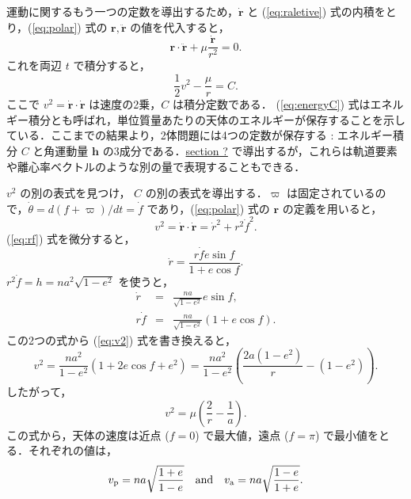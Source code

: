 \documentclass[11pt,a4paper,oneside,onecolumn]{jarticle}
\begin{document}
運動に関するもう一つの定数を導出するため，$\dot{{\bm r}}$ と (\ref{eq:raletive}) 式の内積をとり，(\ref{eq:polar}) 式の ${\bm r}, \ddot{{\bm r}}$ の値を代入すると，
\begin{equation}
{\bm r} \cdot \ddot{{\bm r}} + \mu \frac{\dot{{\bm r}}}{r^2} = 0.
\end{equation}
これを両辺 $t$ で積分すると，
\begin{equation}
\frac{1}{2} v^2 - \frac{\mu}{r} = C. \label{eq:energyC}
\end{equation}
ここで $v^2 = \dot{{\bm r}} \cdot \dot{{\bm r}}$ は速度の2乗，$C$ は積分定数である．
(\ref{eq:energyC}) 式はエネルギー積分とも呼ばれ，単位質量あたりの天体のエネルギーが保存することを示している．ここまでの結果より，2体問題には4つの定数が保存する : エネルギー積分 $C$ と角運動量 ${\bm h}$ の3成分である．\underline{section ?} で導出するが，これらは軌道要素や離心率ベクトルのような別の量で表現することもできる．

$v^2$ の別の表式を見つけ， $C$ の別の表式を導出する．$\varpi$ は固定されているので，$\dot{\theta} = d (f + \varpi) / dt = \dot{f}$ であり，(\ref{eq:polar}) 式の ${\bm r}$ の定義を用いると，
\begin{equation}
v^2 = \dot{{\bm r}} \cdot \dot{{\bm r}} = \dot{r}^2 + r^2 \dot{f}^2. \label{eq:v2}
\end{equation}
(\ref{eq:rf}) 式を微分すると，
\begin{equation}
\dot{r} = \frac{r \dot{f} e \sin f}{1+ e \cos f}.
\end{equation}
$r^2 \dot{f} = h = n a^2 \sqrt{1 - e^2}$ を使うと，
\begin{eqnarray}
\dot{r} & = & \frac{n a}{\sqrt{1 - e^2}} e \sin f, \label{eq:rdot} \\
r \dot{f} & = & \frac{n a}{\sqrt{1 - e^2}} (1+ e \cos f). \label{eq:rfdot}
\end{eqnarray}
この2つの式から (\ref{eq:v2}) 式を書き換えると，
\begin{equation}
v^2 = \frac{n a^2}{1 - e^2} (1 + 2 e \cos f + e^2) = \frac{n a^2}{1 - e^2} \left( \frac{2 a (1 - e^2)}{r} - (1 - e^2) \right).
\end{equation}
したがって，
\begin{equation}
v^2 = \mu \left( \frac{2}{r} - \frac{1}{a} \right). \label{eq:v2new}
\end{equation}
この式から，天体の速度は近点 ($f = 0$) で最大値，遠点 ($f = \pi$) で最小値をとる．それぞれの値は，
\begin{equation}
v_{\rm p} = n a \sqrt{\frac{1 + e}{1 - e}} \quad {\rm and} \quad v_{\rm a} = n a \sqrt{\frac{1 - e}{1 + e}}.
\end{equation}
\end{document}
